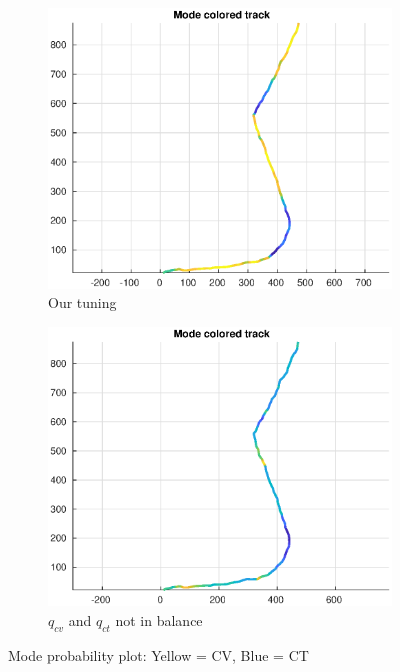 \begin{figure}
    \centering
    \hspace*{-2cm}\begin{adjustbox}{minipage=0.8\linewidth, scale=1}
        \begin{subfigure}{.5\textwidth}
            \includegraphics[width=\linewidth]{plots/task22_modeprob.eps}
            \caption{Our tuning}
            \label{fig:task22_modeprob_tuned}
        \end{subfigure}
        \begin{subfigure}{.5\textwidth}
            \includegraphics[width=\linewidth]{plots/task22_modeprob_highcv.eps}
            \caption{$q_{cv}$ and $q_{ct}$ not in balance}
            \label{fig:task22_modeprob_highcv}
        \end{subfigure}
    \end{adjustbox}
        \caption{Mode probability plot: Yellow = CV, Blue = CT}
        \label{fig:task22_modeprob}
\end{figure}

